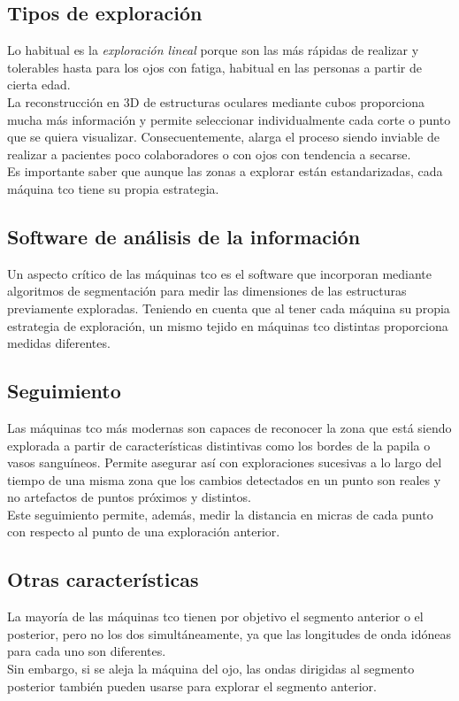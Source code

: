 \subsection{Tipos de exploración}
Lo habitual es la \emph{exploración lineal} porque son las más rápidas
de realizar y tolerables hasta para los ojos con
fatiga, habitual en las personas a partir de cierta edad.\\
La reconstrucción en 3D de estructuras oculares mediante cubos
proporciona mucha más información y permite seleccionar
individualmente cada corte o punto que se quiera
visualizar. Consecuentemente, alarga el proceso siendo inviable de
realizar a pacientes poco colaboradores o con ojos con tendencia a
secarse.\\
Es importante saber que aunque las zonas a explorar están
estandarizadas, cada máquina \gls{tco} tiene su propia estrategia.

\subsection{Software de análisis de la información}
Un aspecto crítico de las máquinas \gls{tco} es el software que
incorporan mediante algoritmos de segmentación para medir las
dimensiones de las estructuras previamente exploradas. Teniendo en
cuenta que al tener cada máquina su propia estrategia de exploración,
un mismo tejido en máquinas \gls{tco} distintas proporciona medidas
diferentes.

\subsection{Seguimiento}
Las máquinas \gls{tco} más modernas son capaces de reconocer la zona
que está siendo explorada a partir de características distintivas como
los bordes de la papila o vasos sanguíneos. Permite asegurar así con
exploraciones sucesivas a lo largo del tiempo de una misma zona que
los cambios detectados en un punto son reales y no artefactos de
puntos próximos y distintos.\\
Este seguimiento permite, además, medir la distancia en micras de cada
punto con respecto al punto de una exploración anterior.

\subsection{Otras características}
La mayoría de las máquinas \gls{tco} tienen por objetivo el segmento
anterior o el posterior, pero no los dos simultáneamente, ya que
las longitudes de onda idóneas para cada uno son diferentes.\\
Sin embargo, si se aleja la máquina del ojo, las ondas dirigidas al
segmento posterior también pueden usarse para explorar el segmento
anterior.

